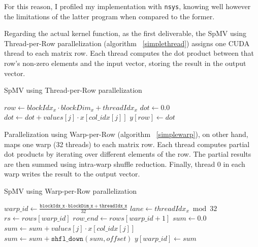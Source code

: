 \documentclass[conference]{IEEEtran}
\begin{document}
For this reason, I profiled my implementation with \texttt{nsys}, knowing well however the limitations of the latter program when compared to the former.

Regarding the actual kernel function, as the first deliverable, the SpMV using Thread-per-Row parallelization (algorithm ~\ref{simplethread}) assigns one CUDA thread to each matrix row. Each thread computes the dot product between that row's non-zero elements and the input vector, storing the result in the output vector.
\begin{algorithm}[ht]
    \caption{SpMV using Thread-per-Row parallelization}
    \label{simplethread}
    \begin{algorithmic}[1]
        \State $row \gets blockIdx_x \cdot blockDim_x + threadIdx_x$
            \State $dot \gets 0.0$
                \State $dot \gets dot + values[j] \cdot x[col\_idx[j]]$
            \EndFor
            \State $y[row] \gets dot$
        \EndIf
    \EndProcedure
    \end{algorithmic}
\end{algorithm}

Parallelization using Warp-per-Row (algorithm ~\ref{simplewarp}), on other hand, maps one warp (32 threads) to each matrix row. Each thread computes partial dot products by iterating over different elements of the row. The partial results are then summed using intra-warp shuffle reduction. Finally, thread 0 in each warp writes the result to the output vector.

\begin{algorithm}[ht]
\caption{SpMV using Warp-per-Row parallelization}
\label{simplewarp}
\begin{algorithmic}[1]
    \State $warp\_id \gets \frac{\texttt{blockIdx\_x} \cdot \texttt{blockDim\_x} + \texttt{threadIdx\_x}}{32}$
    \State $lane \gets threadIdx_x \bmod 32$
        \State $rs \gets rows[warp\_id]$
        \State $row\_end \gets rows[warp\_id + 1]$
        \State $sum \gets 0.0$
            \State $sum \gets sum + values[j] \cdot x[col\_idx[j]]$
        \EndFor
            \State $sum \gets sum + \texttt{shfl\_down}(sum, offset)$
        \EndFor
            \State $y[warp\_id] \gets sum$
        \EndIf
    \EndIf
\EndProcedure
\end{algorithmic}
\end{algorithm}
\end{document}

